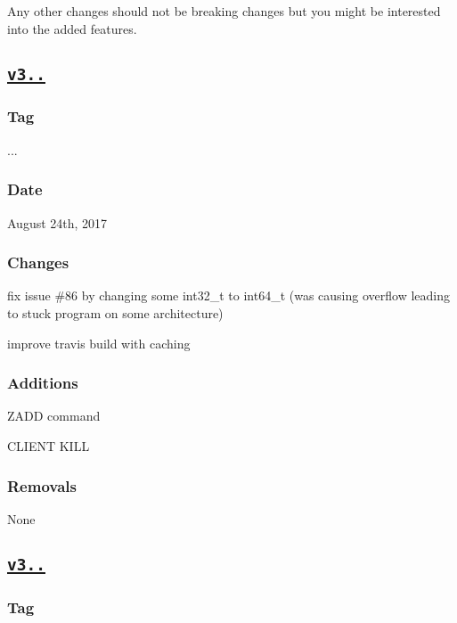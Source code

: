 Any other changes should not be breaking changes but you might be interested into the added features.

\subsection*{\href{https://github.com/Cylix/cpp_redis/releases/tag/3.5.4}{\tt v3..}}

\subsubsection*{Tag}

{..}. \subsubsection*{Date}

August 24th, 2017 \subsubsection*{Changes}


\begin{DoxyItemize}
\item fix issue \#86 by changing some int32\+\_\+t to int64\+\_\+t (was causing overflow leading to stuck program on some architecture)
\item improve travis build with caching \subsubsection*{Additions}
\end{DoxyItemize}


\begin{DoxyItemize}
\item Z\+A\+DD command
\item C\+L\+I\+E\+NT K\+I\+LL \subsubsection*{Removals}
\end{DoxyItemize}

None

\subsection*{\href{https://github.com/Cylix/cpp_redis/releases/tag/3.5.3}{\tt v3..}}

\subsubsection*{Tag}

